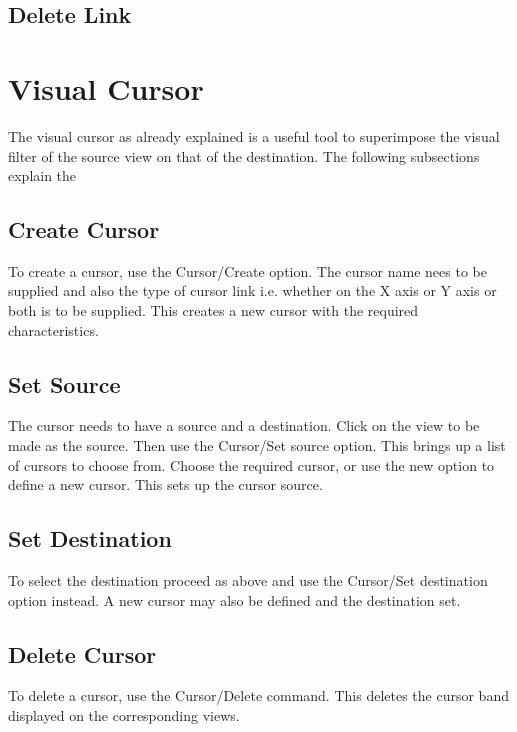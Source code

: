 \subsection{Delete Link}


\section{Visual Cursor}

The visual cursor as already explained is a useful tool to superimpose the visual filter of the source view on that of the destination. The following subsections explain the 

\subsection{Create Cursor}

To create a cursor, use the Cursor/Create option. The cursor name nees to be supplied and also the type of cursor link i.e. whether on the X axis or Y axis or both is to be supplied. This creates a new cursor with the required characteristics. 

\subsection{Set Source}

The cursor needs to have a source and a destination. Click on the view to be made as the source. Then use the Cursor/Set source option. This brings up a list of cursors to choose from. Choose the required cursor, or use the new option to define a new cursor. This sets up the cursor source.

\subsection{Set Destination}

To select the destination proceed as above and use the Cursor/Set destination option instead. A new cursor may also be defined and the destination set.

\subsection{Delete Cursor}

To delete a cursor, use the Cursor/Delete command. This deletes the cursor band displayed  on the corresponding views.

